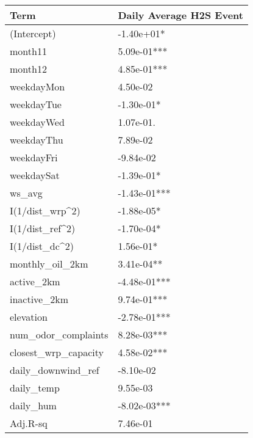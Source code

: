 
\begin{tabular}{l|l}
\hline
Term & Daily Average H2S Event\\
\hline
(Intercept) & -1.40e+01*\\
\hline
month11 & 5.09e-01***\\
\hline
month12 & 4.85e-01***\\
\hline
weekdayMon & 4.50e-02\\
\hline
weekdayTue & -1.30e-01*\\
\hline
weekdayWed & 1.07e-01.\\
\hline
weekdayThu & 7.89e-02\\
\hline
weekdayFri & -9.84e-02\\
\hline
weekdaySat & -1.39e-01*\\
\hline
ws\_avg & -1.43e-01***\\
\hline
I(1/dist\_wrp\textasciicircum{}2) & -1.88e-05*\\
\hline
I(1/dist\_ref\textasciicircum{}2) & -1.70e-04*\\
\hline
I(1/dist\_dc\textasciicircum{}2) & 1.56e-01*\\
\hline
monthly\_oil\_2km & 3.41e-04**\\
\hline
active\_2km & -4.48e-01***\\
\hline
inactive\_2km & 9.74e-01***\\
\hline
elevation & -2.78e-01***\\
\hline
num\_odor\_complaints & 8.28e-03***\\
\hline
closest\_wrp\_capacity & 4.58e-02***\\
\hline
daily\_downwind\_ref & -8.10e-02\\
\hline
daily\_temp & 9.55e-03\\
\hline
daily\_hum & -8.02e-03***\\
\hline
Adj.R-sq & 7.46e-01\\
\hline
\end{tabular}
